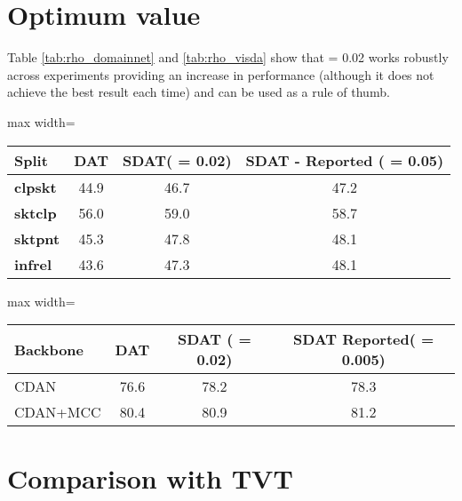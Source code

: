 \documentclass[table,dvipsnames]{article}
\theoremstyle{plain}
\theoremstyle{definition}
\theoremstyle{remark}
\begin{document}
\section{
{Optimum  value}}
\label{app:opt_rho}
Table \ref{tab:rho_domainnet} and \ref{tab:rho_visda} show that  = 0.02 works robustly across experiments providing an increase in performance (although it does not achieve the best result each time) and can be used as a rule of thumb.
\begin{table*}[h!]
    \centering
    \caption{{ value for DomainNet}}
    \vskip 0.15in
     \begin{adjustbox}{max width=\columnwidth}
    \begin{tabular}{l|ccc}
    \hline
    {Split} & DAT &  SDAT( = 0.02) & SDAT - Reported ( = 0.05) \\
\hline \hline
    \textbf{clpskt } & 44.9 & 46.7 & 47.2\\
    
     \textbf{sktclp} & 56.0 & 59.0 & 58.7 \\
      \textbf{sktpnt} & 45.3 & 47.8 & 48.1 \\
       \textbf{infrel} & 43.6 & 47.3 & 48.1\\
\end{tabular}
    
    \label{tab:rho_domainnet}
    \end{adjustbox}
\end{table*}
\begin{table*}[h!]
    \centering
    \caption{{ value for VisDA-2017 Synthetic  Real} }
    \vskip 0.15in
     \begin{adjustbox}{max width=\columnwidth}
    \begin{tabular}{l|ccc}
    \hline
    {Backbone} & DAT &  SDAT ( = 0.02) & SDAT Reported( = 0.005)\\
\hline \hline
    {CDAN} & 76.6 & 78.2 & 78.3\\
     {CDAN+MCC} & 80.4 & 80.9 & 81.2\\
    \end{tabular}
    
    \label{tab:rho_visda}
    \end{adjustbox}
\end{table*}

\section{
{Comparison with TVT}}
\label{app:comp_tvt}
\end{document}
